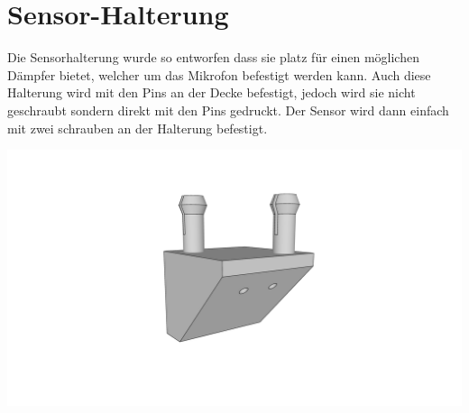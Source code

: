 \section{Sensor-Halterung}

Die Sensorhalterung wurde so entworfen dass sie platz für einen möglichen Dämpfer bietet,
welcher um das Mikrofon befestigt werden kann.
Auch diese Halterung wird mit den Pins an der Decke befestigt, jedoch wird sie nicht geschraubt sondern direkt mit den Pins gedruckt.
Der Sensor wird dann einfach mit zwei schrauben an der Halterung befestigt.

\begin{center}
  \includegraphics[width=1\textwidth]{../images/3DPrinting/SensorStand.png}
\end{center}
